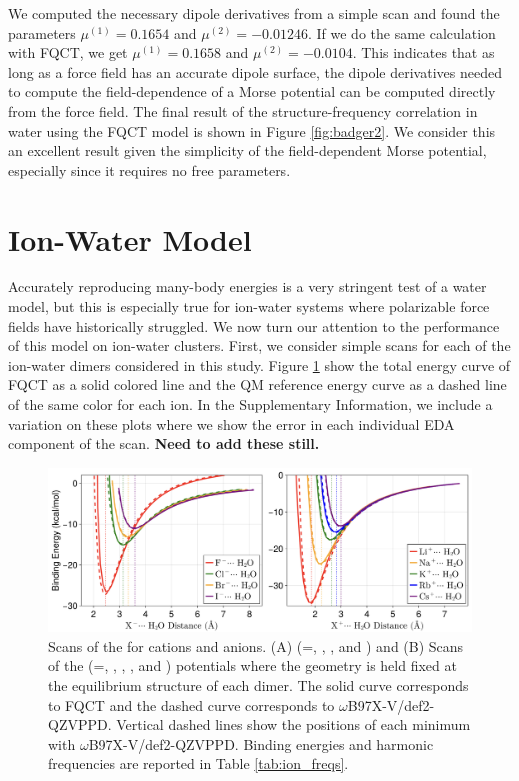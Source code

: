 \documentclass[journal=jctcce,manuscript=article]{achemso}
\begin{document}
We computed the necessary dipole derivatives from a simple  scan and found the parameters $\mu^{(1)}=0.1654$ and $\mu^{(2)}=-0.01246$. If we do the same calculation with FQCT, we get $\mu^{(1)}=0.1658$ and $\mu^{(2)}=-0.0104$. This indicates that as long as a force field has an accurate dipole surface, the dipole derivatives needed to compute the field-dependence of a Morse potential can be computed directly from the force field. The final result of the structure-frequency correlation in water using the FQCT model is shown in Figure \ref{fig:badger2}. We consider this an excellent result given the simplicity of the field-dependent Morse potential, especially since it requires no free parameters.

\section*{Ion-Water Model}
Accurately reproducing many-body energies is a very stringent test of a water model, but this is especially true for ion-water systems where polarizable force fields have historically struggled. We now turn our attention to the performance of this model on ion-water clusters. First, we consider simple scans for each of the ion-water dimers considered in this study. Figure \ref{fig:ion_scans} show the total energy curve of FQCT as a solid colored line and the QM reference energy curve as a dashed line of the same color for each ion. In the Supplementary Information, we include a variation on these plots where we show the error in each individual EDA component of the scan. \textbf{Need to add these still.}
\begin{figure}[h]
  \includegraphics*[width=\textwidth]{figures/anion-cation_dimer_scans.png}
  \caption{Scans of the  for cations and anions. (A) (=, , , and ) and (B) Scans of the  (=, , , , and )
  potentials where the geometry is held fixed at the equilibrium structure of each dimer.
  The solid curve corresponds to FQCT and the dashed curve corresponds to $\omega$B97X-V/def2-QZVPPD.
  Vertical dashed lines show the positions of each minimum with $\omega$B97X-V/def2-QZVPPD.
  Binding energies and harmonic frequencies are reported in Table \ref{tab:ion_freqs}.
  }\label{fig:ion_scans}
\end{figure}
\end{document}
